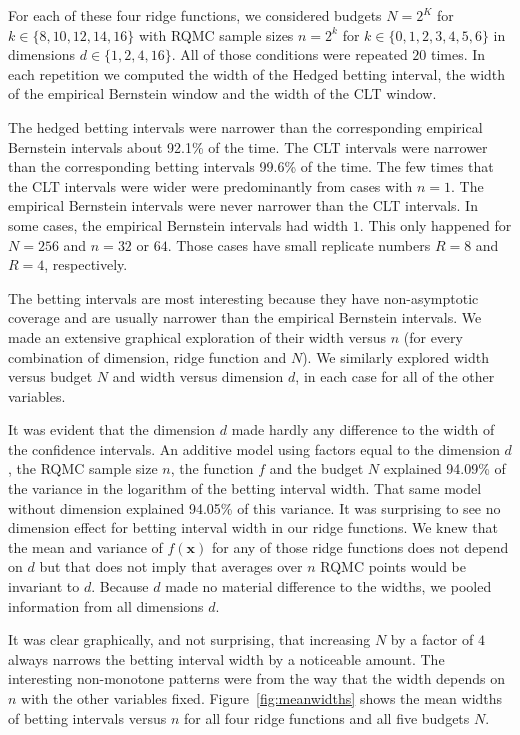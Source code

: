 \documentclass{article}
\newcommand{\art}[1]{\begingroup\color{blue}#1\endgroup}
\newcommand{\aadit}[1]{\begingroup\color{orange}#1\endgroup}
\newcommand{\bsx}{\boldsymbol{x}}
\begin{document}
For each of these four ridge functions, we 
considered budgets \art{$N=2^K$ for $k\in\{8,10,12,14,16\}$
with RQMC sample sizes $n=2^k$ for $k\in\{0,1,2,3,4,5,6\}$}
in dimensions $d\in\{1,2,4,16\}$.  All of those
conditions were repeated $20$ times.    In each
repetition we computed the width of the \aadit{Hedged} betting
interval, the width of the empirical Bernstein
window and the width of the CLT window.

The hedged betting intervals were narrower than the corresponding
empirical Bernstein intervals about 92.1\% of the time.
The CLT intervals were narrower than the corresponding
betting intervals 99.6\% of the time. The few times
that the CLT intervals were wider were predominantly
from cases with $n=1$. The empirical Bernstein
intervals were never narrower than the CLT intervals.
\art{In some cases, the empirical Bernstein intervals
had width $1$. This only happened for $N=256$ and
$n=32$ or $64$. Those cases have small replicate
numbers $R=8$ and $R=4$, respectively.}

The betting intervals are most interesting because they
have non-asymptotic coverage and are usually narrower
than the empirical Bernstein intervals.
We made an extensive graphical exploration of their width
versus $n$ (for every combination of dimension, ridge function and $N$).
We similarly explored width versus budget $N$ and width
versus dimension $d$, in each case for all of the other
variables.  



It was evident that the dimension $d$ made
hardly any difference to the width of the confidence
intervals.  An additive model
using factors equal to the dimension $d$, the RQMC
sample size $n$, the function $f$ and the budget $N$
explained 94.09\% of the variance in the logarithm
of the betting interval width.  That same model without
dimension explained 94.05\%  of this variance.
It was surprising to see no dimension effect
for betting interval width in our ridge functions.
We knew that the mean and variance of $f(\bsx)$ for
any of those ridge functions does not depend on $d$
but that does not imply that averages over $n$ RQMC
points would be invariant to $d$.
Because $d$ made no material difference to the
widths, we pooled information from all dimensions $d$.

It was clear graphically, and not surprising, that increasing $N$ by a factor of $4$ always narrows the betting interval width by a noticeable amount.
The interesting non-monotone patterns were from the way that the
width depends on $n$ with the other variables fixed. 
Figure~\ref{fig:meanwidths} shows the mean widths of
betting intervals versus $n$
for all four ridge functions and all five budgets $N$.
\end{document}
